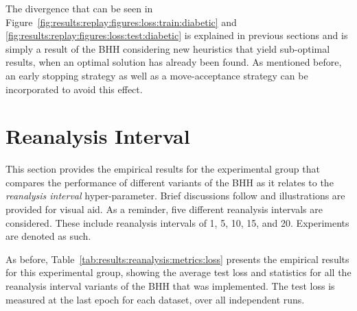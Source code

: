 The divergence that can be seen in Figure~\ref{fig:results:replay:figures:loss:train:diabetic} and \ref{fig:results:replay:figures:loss:test:diabetic} is explained in previous sections and is simply a result of the \acs{BHH} considering new heuristics that yield sub-optimal results, when an optimal solution has already been found. As mentioned before, an early stopping strategy as well as a move-acceptance strategy can be incorporated to avoid this effect.



\section{Reanalysis Interval}\label{sec:results:reanalysis}

This section provides the empirical results for the experimental group that compares the performance of different variants of the \acs{BHH} as it relates to the \textit{reanalysis interval} hyper-parameter. Brief discussions follow and illustrations are provided for visual aid. As a reminder, five different reanalysis intervals are considered. These include reanalysis intervals of 1, 5, 10, 15, and 20. Experiments are denoted as such.

As before, Table~\ref{tab:results:reanalysis:metrics:loss} presents the empirical results for this experimental group, showing the average test loss and statistics for all the reanalysis interval variants of the \acs{BHH} that was implemented. The test loss is measured at the last epoch for each dataset, over all independent runs.

